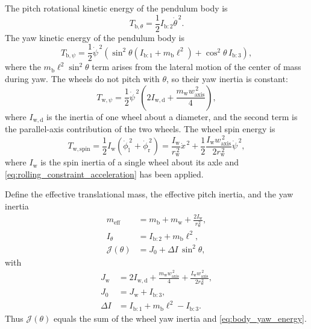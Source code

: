 \documentclass[journal]{IEEEtran}
\begin{document}
The pitch rotational kinetic energy of the pendulum body is
\begin{equation}
    T_{\mathrm b,\theta}
    =
    \frac{1}{2}
    I_{\mathrm b:2}
    \dot{\theta}^{\,2}.
    \label{eq:body_rotational_energy}
\end{equation}
The yaw kinetic energy of the pendulum body is
\begin{equation}
    T_{\mathrm b,\psi}
    =
    \frac{1}{2}
    \dot{\psi}^{\,2}
    \left(
        \sin^2\theta
        \left(I_{\mathrm{b}:1}+m_{\mathrm b}\ell^2\right)
        +\cos^2\theta\, I_{\mathrm{b}:3}
    \right),
    \label{eq:body_yaw_energy}
\end{equation}
where the $m_{\mathrm b}\ell^2\sin^2\theta$ term arises from the lateral
motion of the center of mass during yaw. The wheels do not pitch with
$\theta$, so their yaw inertia is constant:
\begin{equation}
    T_{\mathrm w,\psi}
    =
    \frac{1}{2}
    \dot{\psi}^{\,2}
    \left(
        2I_{\mathrm{w,d}}
        +
        \frac{m_{\mathrm w}w_{\mathrm{axis}}^{\,2}}{4}
    \right),
    \label{eq:wheel_yaw_energy}
\end{equation}
where $I_{\mathrm{w,d}}$ is the inertia of one wheel about a diameter, and
the second term is the parallel-axis contribution of the two wheels. The
wheel spin energy is
\begin{equation}
    T_{\mathrm w,\mathrm{spin}}
    =
    \frac{1}{2}
    I_{\mathrm w}
    \left(
        \dot{\phi}_{\mathrm l}^{\,2}
        +
        \dot{\phi}_{\mathrm r}^{\,2}
    \right)
    =
    \frac{I_{\mathrm w}}{r_{\mathrm w}^{\,2}}\dot{x}^{\,2}
    +
    \frac{1}{2}
    \frac{I_{\mathrm w}w_{\mathrm{axis}}^{\,2}}{2r_{\mathrm w}^{\,2}}
    \dot{\psi}^{\,2},
    \label{eq:wheel_rotational_energy}
\end{equation}
where $I_{\mathrm w}$ is the spin inertia of a single wheel about its axle
and \eqref{eq:rolling_constraint_acceleration} has been applied.

Define the effective translational mass, the effective pitch inertia, and
the yaw inertia
\begin{align}
    m_{\mathrm{eff}}
    &=
    m_{\mathrm b}+m_{\mathrm w}+\frac{2I_{\mathrm w}}{r_{\mathrm w}^{\,2}},
    \label{eq:m_eff}
    \\
    I_{\theta}
    &=
    I_{\mathrm b:2}+m_{\mathrm b}\ell^2,
    \label{eq:I_theta}
    \\
    \mathcal{J}(\theta)
    &=
    J_0 + \Delta I\,\sin^2\theta,
    \label{eq:yaw_inertia}
\end{align}
with
\begin{align}
    J_{\mathrm w}
    &=
    2I_{\mathrm{w,d}}
    +
    \frac{m_{\mathrm w}w_{\mathrm{axis}}^{\,2}}{4}
    +
    \frac{I_{\mathrm w}w_{\mathrm{axis}}^{\,2}}{2r_{\mathrm w}^{\,2}},
    \nonumber\\
    J_0
    &=
    J_{\mathrm w} + I_{\mathrm b:3},
    \nonumber\\
    \Delta I
    &=
    I_{\mathrm b:1} + m_{\mathrm b}\ell^2 - I_{\mathrm b:3}.
    \label{eq:yaw_inertia_constants}
\end{align}
Thus $\mathcal{J}(\theta)$ equals the sum of the wheel yaw inertia and
\eqref{eq:body_yaw_energy}.
\end{document}
